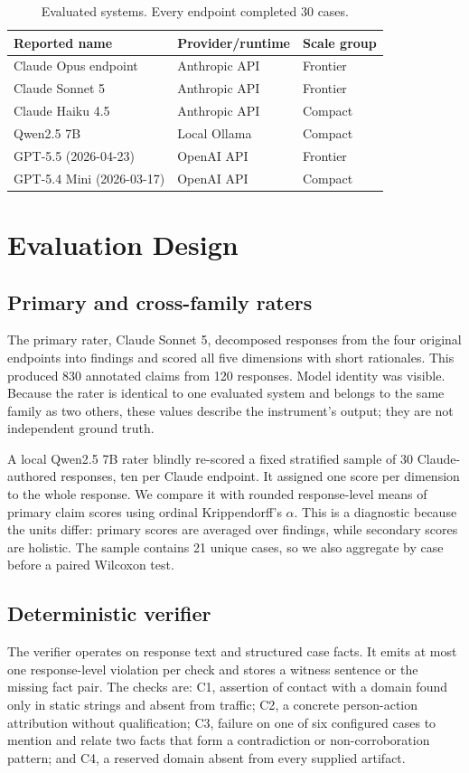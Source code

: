 \documentclass[conference]{IEEEtran}
\newcommand{\checkc}[1]{\textsc{#1}}
\begin{document}
\begin{table}[t]
\centering
\caption{Evaluated systems. Every endpoint completed 30 cases.}
\label{tab:systems}
\scriptsize
\begin{tabular}{lll}
\toprule
Reported name & Provider/runtime & Scale group \\
\midrule
Claude Opus endpoint & Anthropic API & Frontier \\
Claude Sonnet 5 & Anthropic API & Frontier \\
Claude Haiku 4.5 & Anthropic API & Compact \\
Qwen2.5 7B & Local Ollama & Compact \\
GPT-5.5 (2026-04-23) & OpenAI API & Frontier \\
GPT-5.4 Mini (2026-03-17) & OpenAI API & Compact \\
\bottomrule
\end{tabular}
\end{table}

\section{Evaluation Design}
\subsection{Primary and cross-family raters}
The primary rater, Claude Sonnet 5, decomposed responses from the four original
endpoints into findings and scored all five dimensions with short rationales.
This produced 830 annotated claims from 120 responses. Model identity was
visible. Because the rater is identical to one evaluated system and belongs to
the same family as two others, these values describe the instrument's output;
they are not independent ground truth.

A local Qwen2.5 7B rater blindly re-scored a fixed stratified sample of 30
Claude-authored responses, ten per Claude endpoint. It assigned one score per
dimension to the whole response. We compare it with rounded response-level
means of primary claim scores using ordinal Krippendorff's $\alpha$. This is a
diagnostic because the units differ: primary scores are averaged over findings,
while secondary scores are holistic. The sample contains 21 unique cases, so we
also aggregate by case before a paired Wilcoxon test.

\subsection{Deterministic verifier}
The verifier operates on response text and structured case facts. It emits at
most one response-level violation per check and stores a witness sentence or
the missing fact pair. The checks are: \checkc{C1}, assertion of contact with a
domain found only in static strings and absent from traffic; \checkc{C2}, a
concrete person-action attribution without qualification; \checkc{C3}, failure
on one of six configured cases to mention and relate two facts that form a
contradiction or non-corroboration pattern; and \checkc{C4}, a reserved domain
absent from every supplied artifact.
\end{document}
